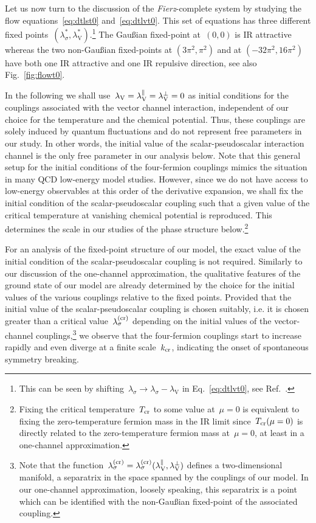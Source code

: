 \documentclass[prd,english,preprintnumbers,amsmath,amssymb,nofootinbib,twocolumn,superscriptaddress]{revtex4-1}
\begin{document}
{Let us now turn to the discussion of the {\it Fierz}-complete system by studying
the flow equations~\eqref{eq:dtlst0} and~\eqref{eq:dtlvt0}.
This set of equations
has three different fixed points~$(\lambda_\sigma^{\ast},\lambda_{\text{V}}^{\ast})$.\footnote{This can be seen by
shifting~$\lambda_{\sigma}\to \lambda_{\sigma}-\lambda_{\text{V}}$ in Eq.~\eqref{eq:dtlvt0}, see Ref.~\cite{Braun:2011pp}.} 
The Gau\ss ian fixed-point at~$(0,0)$ is IR attractive whereas the two non-Gau\ss ian 
fixed-points at $(3 \pi^2, \pi^2)$ and at $(-32 \pi^2 , 16 \pi^2)$ 
have both one IR attractive and one IR repulsive direction, see also Fig.~\ref{fig:flowt0}.

In the following we shall use~$\lambda_\text V = \lambda_\text V ^\parallel = \lambda_\text V ^\perp= 0$ as initial conditions for the couplings associated with
the vector channel interaction, independent of our choice for the temperature and the chemical potential. Thus, these couplings 
are solely induced by quantum fluctuations and do not represent free parameters in our study. In other words, 
the initial value of the scalar-pseudoscalar interaction channel is the only free parameter in our analysis below. Note that this general setup
for the initial conditions of the four-fermion couplings
mimics the situation in many QCD low-energy model studies.
However, since we do not have access to low-energy observables at this order of the derivative expansion,
we shall fix the initial condition of the scalar-pseudoscalar coupling
such that a given value of the critical temperature at vanishing chemical potential is reproduced. 
This determines the scale in our studies of the phase structure below.\footnote{Fixing the critical temperature~$T_{\rm cr}$ to some value at~$\mu=0$
is equivalent to fixing the zero-temperature fermion mass in the IR limit since~$T_{\rm cr}(\mu =0)$ is directly related to the zero-temperature 
fermion mass at~$\mu=0$, at least in a one-channel approximation.} 

For an analysis of the fixed-point structure of our model, the exact value 
of the initial condition of the scalar-pseudoscalar coupling
is not required. Similarly to our discussion of the one-channel approximation, the qualitative features of the ground state of our model 
are already determined by the choice for the initial values of the various couplings relative
to the fixed points.
Provided that the initial value of the scalar-pseudoscalar coupling 
is chosen suitably, i.e. it is 
chosen greater than a critical value~$\lambda_\sigma ^{({\rm cr})}$ depending
on the initial values of the vector-channel couplings,\footnote{Note 
that the function~$\lambda_\sigma ^{({\rm cr})}=\lambda_\sigma ^{({\rm cr})}(\lambda_\text V ^\parallel,\lambda_\text V ^\perp)$
defines a two-dimensional manifold, a separatrix in the space spanned by the couplings of our model. In our one-channel approximation, loosely speaking,
this separatrix is a point which can be identified with {the non-Gau\ss ian fixed-point of} the associated coupling.}
we observe that the four-fermion couplings start to increase rapidly and even diverge at a finite scale~$k_{\rm cr}$, 
indicating the onset of spontaneous symmetry breaking.

}
\end{document}

